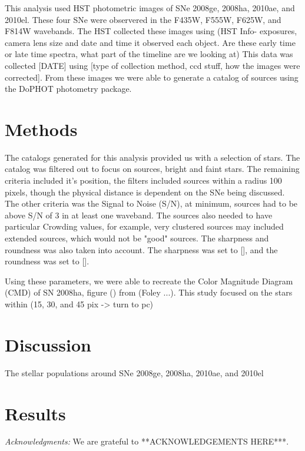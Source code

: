 \documentclass[preprint2]{aastex}
\begin{document}
This analysis used HST photometric images of SNe 2008ge, 2008ha, 
2010ae, and 2010el. 
These four SNe were observered in the F435W, F555W, F625W, 
and F814W wavebands. 
The HST collected these images using (HST Info- exposures, camera lens size 
and date and time it observed each object.
Are these early time or late time spectra, what part of the timeline are we 
looking at)
This data was collected [DATE] using [type of collection method, ccd stuff,
how the images were corrected]. 
From these images we were able to generate a catalog of sources using the
DoPHOT photometry package. 

\section{Methods}
The catalogs generated for this analysis provided us with a selection of stars.
The catalog  was filtered out to focus on sources, bright and faint stars.
The remaining criteria included it's position, the filters included sources within a radius 
100 pixels, though the physical distance is dependent on the SNe being discussed. 
The other criteria was the Signal to Noise (S/N), at minimum, 
sources had to be above S/N of 3 in at least one waveband. 
The sources also needed to have particular Crowding values, for example, 
very clustered sources may included extended sources, which would not be "good" 
sources. The sharpness and roundness was also taken into account. 
The sharpness was set to [], and the roundness was set to []. 

Using these parameters, we were able to recreate the Color Magnitude Diagram (CMD)
of SN 2008ha, figure () from (Foley ...). This study focused on the stars within
 (15, 30, and 45 pix -> turn to pc)


\section{Discussion}
The stellar populations around SNe 2008ge, 2008ha, 2010ae, and 2010el

\section{Results}

{\it Acknowledgments:} We are grateful to **ACKNOWLEDGEMENTS HERE***.

\end{document}
